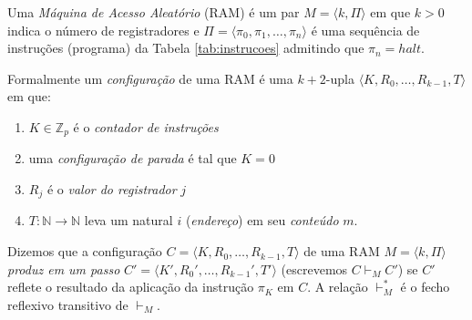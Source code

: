 Uma {\em Máquina de Acesso Aleatório} (RAM) é um par $M = \langle k, \Pi\rangle$ em que $k > 0$ indica o número de registradores e $\Pi = \langle \pi_0, \pi_1, \dots, \pi_n \rangle$ é uma sequência de instruções (programa) da Tabela \ref{tab:instrucoes} admitindo que $\pi_n = halt$. 

Formalmente um {\em configuração} de uma RAM é uma $k+2$-upla $\langle K, R_0, \dots, R_{k-1}, T\rangle$ em que:
\begin{enumerate}
\item $K \in \mathbb{Z}_p$ é o {\em contador de instruções}
\item uma {\em configuração de parada} é tal que $K = 0$
\item $R_j$ é o {\em valor do registrador} $j$
\item $T: \mathbb{N} \to \mathbb{N}$ leva um natural $i$ ({\em endereço}) em seu {\em conteúdo} $m$.
\end{enumerate}

Dizemos que a configuração $C = \langle K, R_0, \dots, R_{k-1}, T\rangle$ de uma RAM $M = \langle k, \Pi\rangle$ {\em produz em um passo} $C' = \langle K', R_0', \dots, R_{k-1}', T'\rangle$ (escrevemos $C \vdash_M C'$) se $C'$ reflete o resultado da aplicação da instrução $\pi_K$ em $C$.
A relação $\vdash_M^*$ é o fecho reflexivo transitivo de $\vdash_M$.

